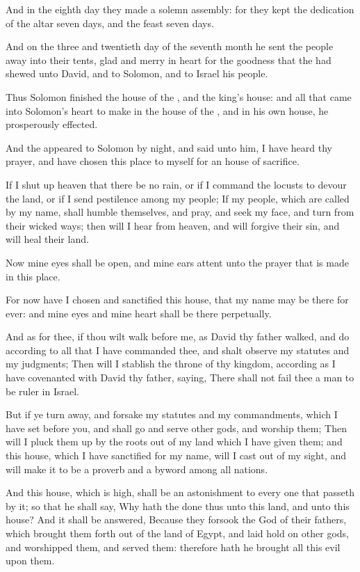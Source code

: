 \verse And in the eighth day they made a solemn assembly: for they kept the dedication of the altar seven days, and the feast seven days.

\verse And on the three and twentieth day of the seventh month he sent the people away into their tents, glad and merry in heart for the goodness that the \LORD had shewed unto David, and to Solomon, and to Israel his people.

\verse Thus Solomon finished the house of the \LORD, and the king's house: and all that came into Solomon's heart to make in the house of the \LORD, and in his own house, he prosperously effected.

\verse And the \LORD appeared to Solomon by night, and said unto him, I have heard thy prayer, and have chosen this place to myself for an house of sacrifice.

\verse If I shut up heaven that there be no rain, or if I command the locusts to devour the land, or if I send pestilence among my people; \verse If my people, which are called by my name, shall humble themselves, and pray, and seek my face, and turn from their wicked ways; then will I hear from heaven, and will forgive their sin, and will heal their land.

\verse Now mine eyes shall be open, and mine ears attent unto the prayer that is made in this place.

\verse For now have I chosen and sanctified this house, that my name may be there for ever: and mine eyes and mine heart shall be there perpetually.

\verse And as for thee, if thou wilt walk before me, as David thy father walked, and do according to all that I have commanded thee, and shalt observe my statutes and my judgments; \verse Then will I stablish the throne of thy kingdom, according as I have covenanted with David thy father, saying, There shall not fail thee a man to be ruler in Israel.

\verse But if ye turn away, and forsake my statutes and my commandments, which I have set before you, and shall go and serve other gods, and worship them; \verse Then will I pluck them up by the roots out of my land which I have given them; and this house, which I have sanctified for my name, will I cast out of my sight, and will make it to be a proverb and a byword among all nations.

\verse And this house, which is high, shall be an astonishment to every one that passeth by it; so that he shall say, Why hath the \LORD done thus unto this land, and unto this house?  \verse And it shall be answered, Because they forsook the \LORD God of their fathers, which brought them forth out of the land of Egypt, and laid hold on other gods, and worshipped them, and served them: therefore hath he brought all this evil upon them.


